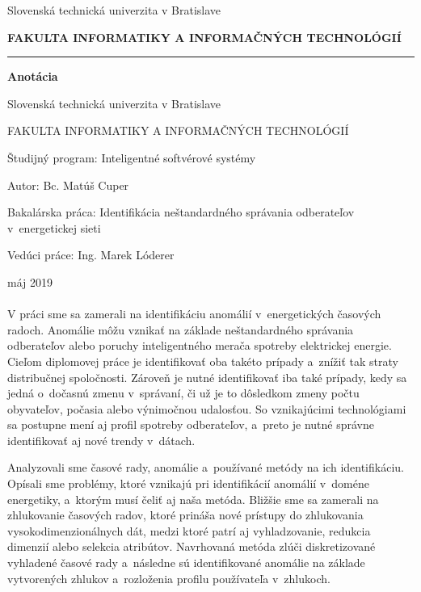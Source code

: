 \documentclass[a4paper,twoside,slovak,12pt,appendix]{article}
\begin{document}


\begin{titlepage}
\begin{center}
  {\small Slovenská technická univerzita v Bratislave \par}
  {\small \textbf{FAKULTA INFORMATIKY A INFORMAČNÝCH TECHNOLÓGIÍ}}
  \rule{\textwidth}{1pt}

  \vspace*{1.5cm}
  \begin{Large}
    \textbf{Anotácia} \par
  \end{Large}
\end{center}
{Slovenská technická univerzita v Bratislave \par}
{FAKULTA INFORMATIKY A INFORMAČNÝCH TECHNOLÓGIÍ \par}
{Študijný program: Inteligentné softvérové systémy \par}
{Autor: Bc. Matúš Cuper \par}
{Bakalárska práca: Identifikácia neštandardného správania odberateľov v~energetickej sieti \par}
{Vedúci práce: Ing. Marek Lóderer \par}
{máj 2019 \\} \\
V práci sme sa zamerali na identifikáciu anomálií v~energetických časových
radoch. Anomálie môžu vznikať na základe neštandardného správania odberateľov
alebo poruchy inteligentného merača spotreby elektrickej energie. Cieľom
diplomovej práce je identifikovať oba takéto prípady a~znížiť tak straty
distribučnej spoločnosti. Zároveň je nutné identifikovať iba také prípady, kedy
sa jedná o~dočasnú zmenu v~správaní, či už je to dôsledkom zmeny počtu
obyvateľov, počasia alebo výnimočnou udalosťou. So vznikajúcimi technológiami
sa postupne mení aj profil spotreby odberateľov, a~preto je nutné správne
identifikovať aj nové trendy v~dátach.

Analyzovali sme časové rady, anomálie a~používané metódy na ich identifikáciu.
Opísali sme problémy, ktoré vznikajú pri identifikácií anomálií v~doméne
energetiky, a~ktorým musí čeliť aj naša metóda. Bližšie sme sa zamerali na
zhlukovanie časových radov, ktoré prináša nové prístupy do zhlukovania
vysokodimenzionálnych dát, medzi ktoré patrí aj vyhladzovanie, redukcia dimenzií
alebo selekcia atribútov. Navrhovaná metóda zlúči diskretizované vyhladené
časové rady a~následne sú identifikované anomálie na základe vytvorených zhlukov
a~rozloženia profilu používateľa v~zhlukoch.
\end{titlepage}
\end{document}
